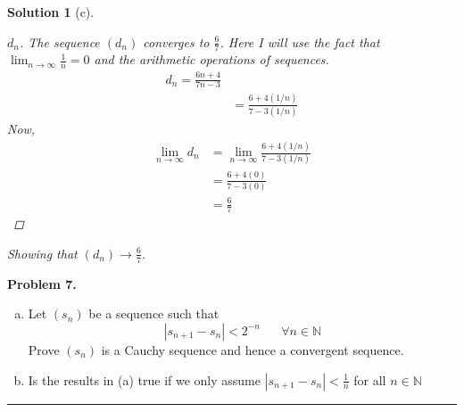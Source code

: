 \documentclass[leqno]{article}
\theoremstyle{nonumberplain}
\newtheorem{proof}{Proof}
\newtheorem{solution}{Solution}
\begin{document}
\begin{solution}[c]
\begin{proof}[$d_n$]
The sequence $(d_n)$ converges to $\frac{6}{7}$. Here I will use the fact that $\lim_{n \to \infty} \frac{1}{n} = 0$ and the arithmetic operations of sequences.  
\begin{align*}
d_n = \frac{6n+4}{7n-3}\\
&=\frac{6+4(1/n)}{7-3(1/n)}
\end{align*}
Now,
\begin{align*}
\lim_{n \to \infty} d_n &= \lim_{n \to \infty} \frac{6+4(1/n)}{7-3(1/n)}\\
&=\frac{6+4(0)}{7-3(0)}\\
&=\frac{6}{7}
\end{align*}
\end{proof}
Showing that $(d_n) \to \frac{6}{7}$.

\end{solution}
\pagebreak




\noindent\textbf{Problem 7.} 
\begin{enumerate}[(a)]
\item
Let $(s_n)$ be a sequence such that
\[
|s_{n+1}-s_n|<2^{-n} \text{ ~~~~} \forall n \in \mathbb{N}
\] 
Prove $(s_n)$ is a Cauchy sequence and hence a convergent sequence.
\item
Is the results in (a) true if we only assume $|s_{n+1} - s_n| < \frac{1}{n}$ for all $n \in \mathbb{N}$
\end{enumerate}

\noindent\rule[0.5ex]{\linewidth}{1pt}
\end{document}
